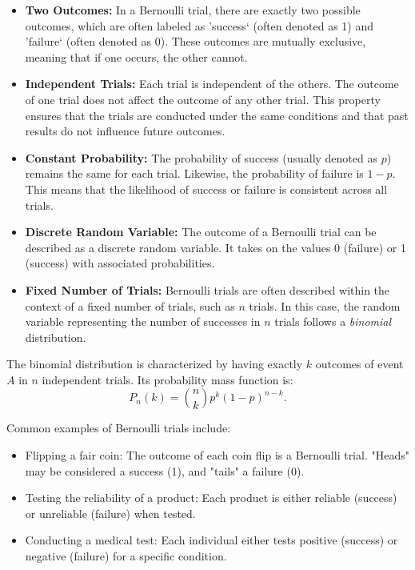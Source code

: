 \documentclass[12pt]{book}
\theoremstyle{definition}
\begin{document}
\begin{itemize}
    \item \textbf{Two Outcomes:} In a Bernoulli trial, there are exactly two possible outcomes, which are often labeled as 'success` (often denoted as 1) and 'failure` (often denoted as 0). These outcomes are mutually exclusive, meaning that if one occurs, the other cannot.
    \item \textbf{Independent Trials:} Each trial is independent of the others. The outcome of one trial does not affect the outcome of any other trial. This property ensures that the trials are conducted under the same conditions and that past results do not influence future outcomes.

    \item \textbf{Constant Probability:} The probability of success (usually denoted as \(p\)) remains the same for each trial. Likewise, the probability of failure is \(1 - p\). This means that the likelihood of success or failure is consistent across all trials.

    \item \textbf{Discrete Random Variable:} The outcome of a Bernoulli trial can be described as a discrete random variable. It takes on the values 0 (failure) or 1 (success) with associated probabilities.

    \item \textbf{Fixed Number of Trials:} Bernoulli trials are often described within the context of a fixed number of trials, such as \(n\) trials. In this case, the random variable representing the number of successes in \(n\) trials follows a \emph{binomial} distribution.
\end{itemize}

The binomial distribution is characterized by having exactly $k$ outcomes of event $A$ in $n$ independent trials. Its probability mass function is:
\[ P_n(k) = \binom{n}{k}  p^k (1 - p)^{n - k}. \]


Common examples of Bernoulli trials include:
\begin{itemize}
    \item Flipping a fair coin: The outcome of each coin flip is a Bernoulli trial. "Heads" may be considered a success (1), and "tails" a failure (0).
    \item Testing the reliability of a product: Each product is either reliable (success) or unreliable (failure) when tested.
    \item Conducting a medical test: Each individual either tests positive (success) or negative (failure) for a specific condition.
\end{itemize}
\end{document}
